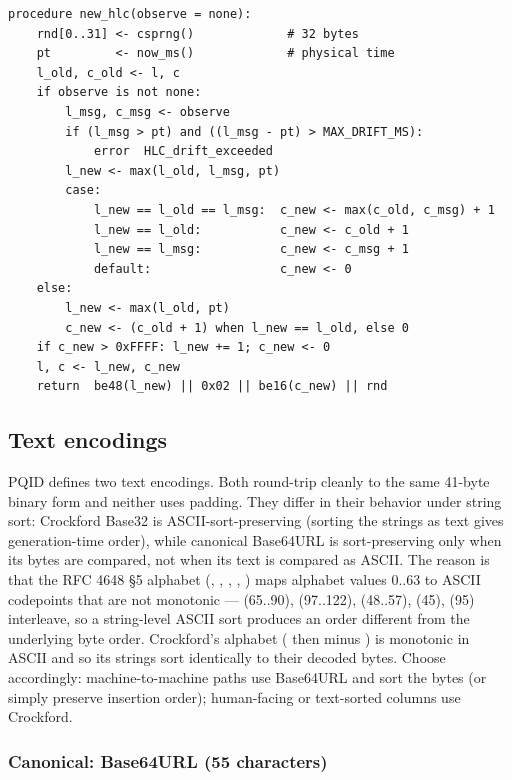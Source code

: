 \begin{lstlisting}[language=Pseudocode,caption={HLC PQID generation (with optional peer observation)},label={lst:gen-hlc}]
procedure new_hlc(observe = none):
    rnd[0..31] <- csprng()             # 32 bytes
    pt         <- now_ms()             # physical time
    l_old, c_old <- l, c
    if observe is not none:
        l_msg, c_msg <- observe
        if (l_msg > pt) and ((l_msg - pt) > MAX_DRIFT_MS):
            error  HLC_drift_exceeded
        l_new <- max(l_old, l_msg, pt)
        case:
            l_new == l_old == l_msg:  c_new <- max(c_old, c_msg) + 1
            l_new == l_old:           c_new <- c_old + 1
            l_new == l_msg:           c_new <- c_msg + 1
            default:                  c_new <- 0
    else:
        l_new <- max(l_old, pt)
        c_new <- (c_old + 1) when l_new == l_old, else 0
    if c_new > 0xFFFF: l_new += 1; c_new <- 0
    l, c <- l_new, c_new
    return  be48(l_new) || 0x02 || be16(c_new) || rnd
\end{lstlisting}

\subsection{Text encodings}

PQID defines two text encodings. Both round-trip cleanly to the same 41-byte binary form and neither uses padding. They differ in their behavior under string sort: Crockford Base32 \citep{crockford} is ASCII-sort-preserving (sorting the strings as text gives generation-time order), while canonical Base64URL is sort-preserving only when its bytes are compared, not when its text is compared as ASCII. The reason is that the RFC 4648 §5 alphabet \citep{rfc4648} (, , , \code{-}, \code{\_}) maps alphabet values 0..63 to ASCII codepoints that are not monotonic ---  (65..90),  (97..122),  (48..57), \code{-} (45), \code{\_} (95) interleave, so a string-level ASCII sort produces an order different from the underlying byte order. Crockford's alphabet ( then  minus ) is monotonic in ASCII and so its strings sort identically to their decoded bytes. Choose accordingly: machine-to-machine paths use Base64URL and sort the bytes (or simply preserve insertion order); human-facing or text-sorted columns use Crockford.

\subsubsection{Canonical: Base64URL (55 characters)}

